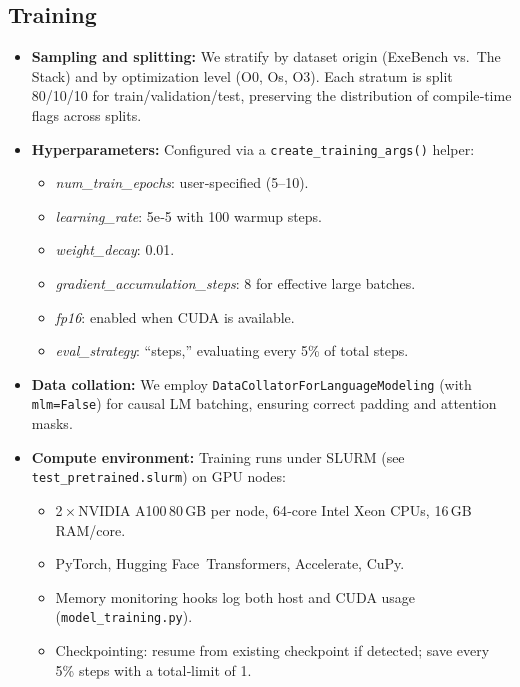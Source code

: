 \documentclass[../main.tex]{subfiles}
\begin{document}
\subsection{Training}

\begin{itemize}
  \item \textbf{Sampling and splitting:}  
    We stratify by dataset origin (ExeBench vs.\ The Stack) and by optimization level (O0, Os, O3). Each stratum is split 80/10/10 for train/validation/test, preserving the distribution of compile‑time flags across splits.

  \item \textbf{Hyperparameters:}  
    Configured via a \texttt{create\_training\_args()} helper:
    \begin{itemize}
      \item \emph{num\_train\_epochs}: user‑specified (5–10).  
      \item \emph{learning\_rate}: 5e‑5 with 100 warmup steps.  
      \item \emph{weight\_decay}: 0.01.  
      \item \emph{gradient\_accumulation\_steps}: 8 for effective large batches.  
      \item \emph{fp16}: enabled when CUDA is available.  
      \item \emph{eval\_strategy}: “steps,” evaluating every 5\% of total steps.  
    \end{itemize}

  \item \textbf{Data collation:}  
    We employ \texttt{DataCollatorForLanguageModeling} (with \texttt{mlm=False}) for causal LM batching, ensuring correct padding and attention masks.

  \item \textbf{Compute environment:}  
    Training runs under SLURM (see \texttt{test\_pretrained.slurm}) on GPU nodes:
    \begin{itemize}
      \item 2 × NVIDIA A100 80 GB per node, 64‑core Intel Xeon CPUs, 16 GB RAM/core.  
      \item PyTorch, Hugging Face Transformers, Accelerate, CuPy.  
      \item Memory monitoring hooks log both host and CUDA usage (\texttt{model\_training.py}).  
      \item Checkpointing: resume from existing checkpoint if detected; save every 5\% steps with a total‐limit of 1.
    \end{itemize}


\end{itemize}
\end{document}
